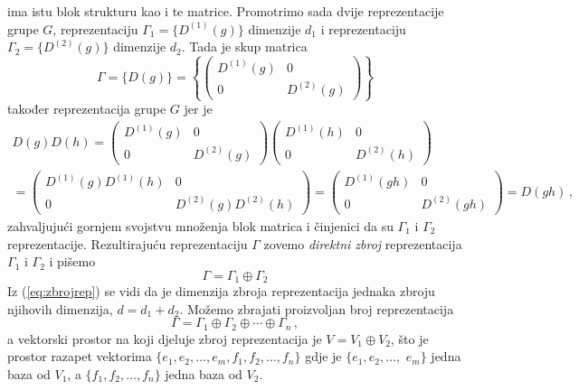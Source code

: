 ima istu blok strukturu kao i te matrice.
Promotrimo sada dvije reprezentacije grupe $G$,
reprezentaciju $\Gamma_{1}=\{D^{(1)}(g)\}$
dimenzije $d_1$ i reprezentaciju $\Gamma_{2}=\{D^{(2)}(g)\}$ dimenzije $d_2$.
Tada je skup matrica 
\begin{equation}
   \Gamma = \{D(g)\}= \left\{ 
   \begin{pmatrix}
     D^{(1)}(g) & 0 \\
       0  & D^{(2)}(g)
\end{pmatrix} \right\}
\label{eq:zbrojrep}
\end{equation}
također reprezentacija grupe $G$ jer je
\begin{multline*}
D(g)D(h)=
   \begin{pmatrix}
     D^{(1)}(g) & 0 \\
       0  & D^{(2)}(g)
\end{pmatrix}
   \begin{pmatrix}
     D^{(1)}(h) & 0 \\
       0  & D^{(2)}(h)
\end{pmatrix}  \\[2ex]
   =\! \begin{pmatrix}
     D^{(1)}(g)D^{(1)}(h) & 0 \\
       0  & D^{(2)}(g)D^{(2)}(h)
\end{pmatrix} 
\!=\!
   \begin{pmatrix}
     D^{(1)}(gh) & 0 \\
       0  & D^{(2)}(gh)
\end{pmatrix} 
=D(gh) \,,
\end{multline*}
zahvaljujući gornjem svojstvu množenja blok matrica i činjenici
da su $\Gamma_1$ i $\Gamma_2$ reprezentacije.
Rezultirajuću reprezentaciju $\Gamma$ zovemo \emph{direktni zbroj}
reprezentacija $\Gamma_1$ i $\Gamma_2$ i pišemo
\begin{displaymath}
\Gamma = \Gamma_1 \oplus \Gamma_2
\end{displaymath}
Iz (\ref{eq:zbrojrep}) se vidi da je
dimenzija zbroja reprezentacija jednaka zbroju njihovih dimenzija, $d=d_1 + d_2$.
Možemo zbrajati proizvoljan broj reprezentacija
\begin{displaymath}
\Gamma = \Gamma_1 \oplus \Gamma_2 \oplus \cdots \oplus \Gamma_n \,,
\end{displaymath}
a vektorski prostor na koji djeluje zbroj reprezentacija je
  $V=V_1 \oplus V_2$, što je prostor razapet vektorima
  $\{e_1, e_2, \ldots, e_m, f_1, f_2, \ldots, f_n\}$ gdje je
  $\{e_1, e_2, \ldots,$ $e_m\}$ jedna baza od $V_1$, a
  $\{f_1, f_2, \ldots, f_n\}$ jedna baza od $V_2$.

